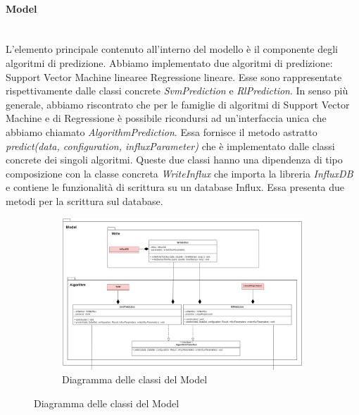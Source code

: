 \paragraph{Model} \mbox{}\\ [1mm]
L'elemento principale contenuto all'interno del modello è il componente degli algoritmi di predizione. Abbiamo implementato due algoritmi di predizione: Support Vector Machine lineare\glosp e Regressione lineare\glo. Esse sono rappresentate rispettivamente dalle classi concrete \textit{SvmPrediction} e \textit{RlPrediction}. In senso più generale, abbiamo riscontrato che per le famiglie di algoritmi di Support Vector Machine e di Regressione è possibile ricondursi ad un'interfaccia unica che abbiamo chiamato \textit{AlgorithmPrediction}. Essa fornisce il metodo astratto \textit{predict(data, configuration, influxParameter)} che è implementato dalle classi concrete dei singoli algoritmi.
Queste due classi hanno una dipendenza di tipo composizione con la classe concreta \textit{WriteInflux} che importa la libreria \textit{InfluxDB} e contiene le funzionalità di scrittura su un database Influx. Essa presenta due metodi per la scrittura sul database.
\mbox{}
\begin{landscape}
	\begin{figure}
		\begin{figure} [H]
			\includegraphics[width=\linewidth]{./img/Diagrammi/model-plug-in.png}
			\caption{Diagramma delle classi del Model}
		\end{figure}
	\end{figure}
\end{landscape}
